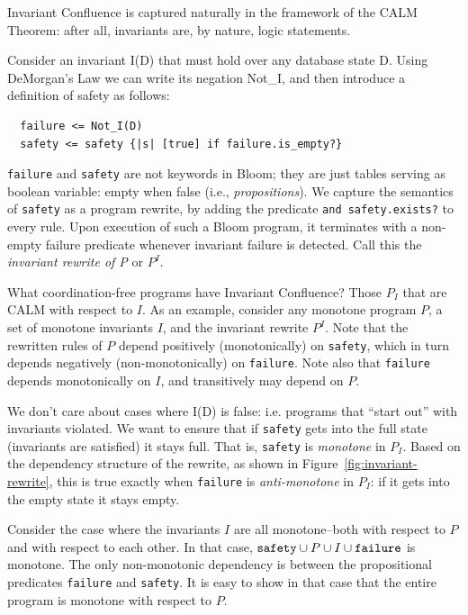 \documentclass{sig-alternate}
\begin{document}
Invariant Confluence is captured naturally in the framework of the CALM Theorem: after all, invariants are, by nature, logic statements.

Consider an invariant I(D) that must hold over any database state D.  Using DeMorgan's Law we can write its negation Not\_I, and then introduce a definition of safety as follows:

\begin{verbatim}
  failure <= Not_I(D)
  safety <= safety {|s| [true] if failure.is_empty?}
\end{verbatim}

\texttt{failure} and \texttt{safety} are not keywords in Bloom; they are just tables serving as boolean variable: empty when false (i.e., \emph{propositions}). We capture the semantics of \texttt{safety} as a program rewrite, by adding the predicate \texttt{and safety.exists?} to every rule.  Upon execution of such a Bloom program, it terminates with a non-empty failure predicate whenever invariant failure is detected.  Call this the \emph{invariant rewrite of P} or $P^I$.  

What coordination-free programs have Invariant Confluence?   Those $P_I$ that are CALM with respect to $I$. As an example, consider any monotone program $P$, a set of monotone invariants $I$, and the invariant rewrite $P^I$.  Note that the rewritten rules of $P$ depend positively (monotonically) on \texttt{safety}, which in turn depends negatively (non-monotonically) on \texttt{failure}.  Note also that \texttt{failure} depends monotonically on $I$, and transitively may depend on $P$.

We don't care about cases where I(D) is false: i.e. programs that ``start out'' with invariants violated.  We want to ensure that if \texttt{safety} gets into the full state (invariants are satisfied) it stays full.  That is, \texttt{safety} is \emph{monotone} in $P_I$.   Based on the dependency structure of the rewrite, as shown in Figure~\ref{fig:invariant-rewrite}, this is true exactly when \texttt{failure} is \emph{anti-monotone} in $P_I$: if it gets into the empty state it stays empty.  

Consider the case where the invariants $I$ are all monotone--both with respect to $P$ and with respect to each other.  In that case, $\mbox{\texttt{safety}} \cup P \cup I \cup \mbox{\texttt{failure}}$ is monotone. The only non-monotonic dependency is between the propositional predicates \texttt{failure} and \texttt{safety}.  It is easy to show in that case that the entire program is monotone with respect to $P$.
\end{document}
